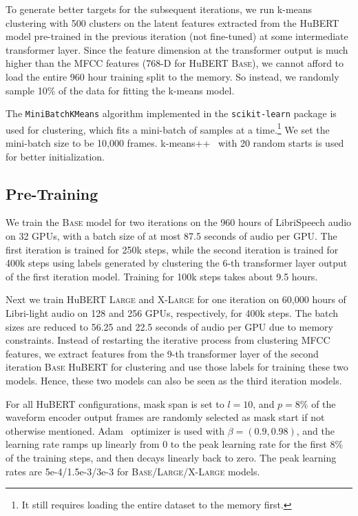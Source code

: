 To generate better targets for the subsequent iterations, we run k-means clustering with 500 clusters on the latent features extracted from the HuBERT model pre-trained in the previous iteration (not fine-tuned) at some intermediate transformer layer.
Since the feature dimension at the transformer output is much higher than the MFCC features (768-D for HuBERT \textsc{Base}), we cannot afford to load the entire 960 hour training split to the memory. So instead, we randomly sample 10\% of the data for fitting the k-means model.

The \texttt{MiniBatchKMeans} algorithm implemented in the \texttt{scikit-learn} \cite{pedregosa2011scikit} package is used for clustering, which fits a mini-batch of samples at a time.\footnote{It still requires loading the entire dataset to the memory first.} We set the mini-batch size to be 10,000 frames. k-means++~\cite{arthur2006k} with 20 random starts is used for better initialization.

\subsection{Pre-Training}\label{sec:pretrain}
We train the \textsc{Base} model for two iterations on the 960 hours of LibriSpeech audio on 32 GPUs, with a batch size of at most 87.5 seconds of audio per GPU. The first iteration is trained for 250k steps, while the second iteration is trained for 400k steps using labels generated by clustering the 6-th transformer layer output of the first iteration model. Training for 100k steps takes about 9.5 hours.

Next we train HuBERT \textsc{Large} and \textsc{X-Large} for one iteration on 60,000 hours of Libri-light audio on 128 and 256 GPUs, respectively, for 400k steps. The batch sizes are reduced to 56.25 and 22.5 seconds of audio per GPU due to memory constraints.
Instead of restarting the iterative process from clustering MFCC features, we extract features from the 9-th transformer layer of the second iteration \textsc{Base} HuBERT for clustering and use those labels for training these two models. Hence, these two models can also be seen as the third iteration models.

For all HuBERT configurations, mask span is set to $l=10$, and $p=8\%$ of the waveform encoder output frames are randomly selected as mask start if not otherwise mentioned. Adam~\cite{kingma2014adam} optimizer is used with $\beta = (0.9, 0.98)$, and the learning rate ramps up linearly from 0 to the peak learning rate for the first 8\% of the training steps, and then decays linearly back to zero. The peak learning rates are 5e-4/1.5e-3/3e-3 for \textsc{Base}/\textsc{Large}/\textsc{X-Large} models.

